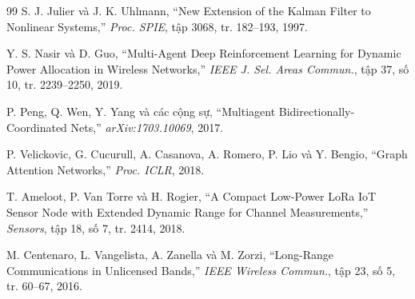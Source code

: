 \documentclass[conference]{IEEEtran}
\begin{document}
\begin{thebibliography}{99}
S. J. Julier và J. K. Uhlmann, ``New Extension of the
Kalman Filter to Nonlinear Systems,''
\textit{Proc. SPIE}, tập 3068, tr. 182--193, 1997.

Y. S. Nasir và D. Guo, ``Multi-Agent Deep Reinforcement
Learning for Dynamic Power Allocation in Wireless Networks,''
\textit{IEEE J. Sel. Areas Commun.}, tập 37, số 10,
tr. 2239--2250, 2019.

P. Peng, Q. Wen, Y. Yang và các cộng sự,
``Multiagent Bidirectionally-Coordinated Nets,''
\textit{arXiv:1703.10069}, 2017.

P. Velickovic, G. Cucurull, A. Casanova, A. Romero, P. Lio
và Y. Bengio, ``Graph Attention Networks,''
\textit{Proc. ICLR}, 2018.

T. Ameloot, P. Van Torre và H. Rogier,
``A Compact Low-Power LoRa IoT Sensor Node with Extended
Dynamic Range for Channel Measurements,''
\textit{Sensors}, tập 18, số 7, tr. 2414, 2018.

M. Centenaro, L. Vangelista, A. Zanella và M. Zorzi,
``Long-Range Communications in Unlicensed Bands,''
\textit{IEEE Wireless Commun.}, tập 23, số 5,
tr. 60--67, 2016.

\end{thebibliography}
\end{document}
